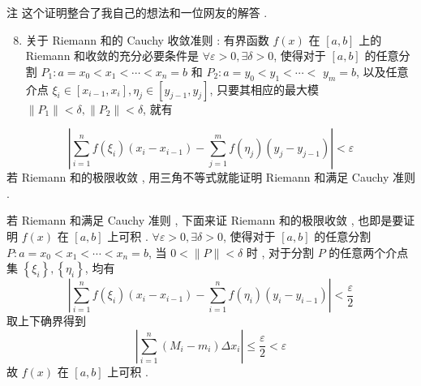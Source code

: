 \documentclass[10pt]{article}
\begin{document}
 注   这个证明整合了我自己的想法和一位网友的解答 .

\begin{enumerate}
  \setcounter{enumi}{7}
  \item  关于  Riemann  和的  Cauchy  收敛准则 :  有界函数  $f(x)$  在  $[a, b]$  上的  Riemann  和收敛的充分必要条件是  $\forall \varepsilon>0, \exists \delta>0$,  使得对于  $[a, b]$  的任意分割  $P_{1}: a=x_{0}<x_{1}<\cdots<x_{n}=b$  和  $P_{2}: a=y_{0}<y_{1}<\cdots<$ $y_{m}=b$,  以及任意介点  $\xi_{i} \in\left[x_{i-1}, x_{i}\right], \eta_{j} \in\left[y_{j-1}, y_{j}\right]$,  只要其相应的最大模  $\left\|P_{1}\right\|<\delta,\left\|P_{2}\right\|<\delta$,  就有 
\end{enumerate}
$$
\left|\sum_{i=1}^{n} f\left(\xi_{i}\right)\left(x_{i}-x_{i-1}\right)-\sum_{j=1}^{m} f\left(\eta_{j}\right)\left(y_{j}-y_{j-1}\right)\right|<\varepsilon
$$
 若  Riemann  和的极限收敛 ,  用三角不等式就能证明  Riemann  和满足  Cauchy  准则 .

 若  Riemann  和满足  Cauchy  准则 ,  下面来证  Riemann  和的极限收敛 ,  也即是要证明  $f(x)$  在  $[a, b]$  上可积 . $\forall \varepsilon>0, \exists \delta>0$,  使得对于  $[a, b]$  的任意分割  $P: a=x_{0}<x_{1}<\cdots<x_{n}=b$,  当  $0<\|P\|<\delta$  时 ,  对于分割  $P$  的任意两个介点集  $\left\{\xi_{i}\right\},\left\{\eta_{i}\right\}$,  均有 
$$
\left|\sum_{i=1}^{n} f\left(\xi_{i}\right)\left(x_{i}-x_{i-1}\right)-\sum_{i=1}^{n} f\left(\eta_{i}\right)\left(y_{i}-y_{i-1}\right)\right|<\frac{\varepsilon}{2}
$$
 取上下确界得到 
$$
\left|\sum_{i=1}^{n}\left(M_{i}-m_{i}\right) \Delta x_{i}\right| \leqslant \frac{\varepsilon}{2}<\varepsilon
$$
 故  $f(x)$  在  $[a, b]$  上可积 .
\end{document}
